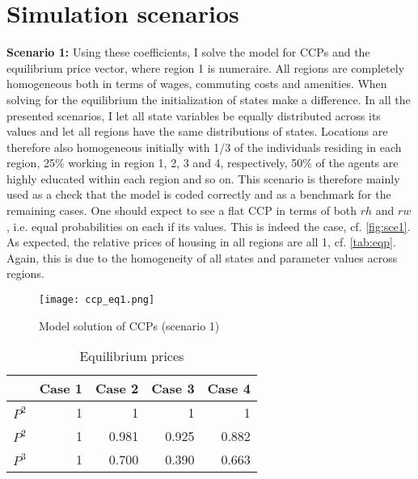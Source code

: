 \section{Simulation scenarios}
 \textbf{Scenario 1:} Using these coefficients, I solve the model for CCPs and the equilibrium price vector, where region 1 is numeraire. All regions are completely homogeneous both in terms of wages, commuting costs and amenities. When solving for the equilibrium the initialization of states make a difference. In all the presented scenarios, I let all state variables be equally distributed across its values and let all regions have the same distributions of states. Locations are therefore also homogeneous initially with 1/3 of the individuals residing in each region, 25\% working in region 1, 2, 3 and 4, respectively, 50\% of the agents are highly educated within each region and so on. This scenario is therefore mainly used as a check that the model is coded correctly and as a benchmark for the remaining cases. One should expect to see a flat CCP in terms of both $rh$ and $rw$, i.e. equal probabilities on each if its values. This is indeed the case, cf. \autoref{fig:sce1}. As expected, the relative prices of housing in all regions are all 1, cf. \autoref{tab:eqp}. Again, this is due to the homogeneity of all states and parameter values across regions.

\begin{figure}
\centering
\texttt{[image: ccp\_eq1.png]} 
\caption{Model solution of CCPs (scenario 1)}
\label{fig:sce1}
\end{figure}

\begin{table}[]
\centering
\caption{Equilibrium prices}
\label{tab:eqp}
\begin{tabular}{@{}l r r r r@{}}
\toprule
&Case 1 & Case 2 & Case 3      & Case 4        \\ \midrule
$P^2$     & 1      & 1           & 1           & 1 \\
$P^2$     & 1      & 0.981 & 0.925 &  0.882\\
$P^3$     & 1      & 0.700 & 0.390 &  0.663 \\ \bottomrule
\end{tabular}
\end{table}

